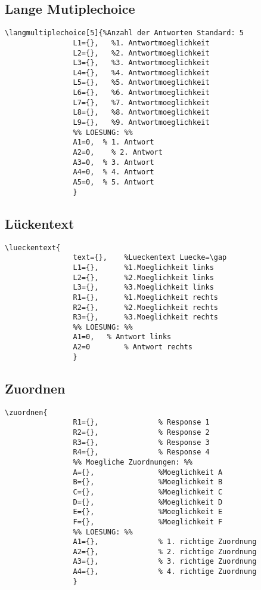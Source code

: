\documentclass[a4paper,12pt]{report}
\begin{document}
\begin{scriptsize}
\begin{minipage}{0.5\textwidth}
\subsection{Lange Mutiplechoice}
\begin{verbatim}
\langmultiplechoice[5]{%Anzahl der Antworten Standard: 5
				L1={},   %1. Antwortmoeglichkeit 
				L2={},   %2. Antwortmoeglichkeit
				L3={},   %3. Antwortmoeglichkeit
				L4={},   %4. Antwortmoeglichkeit
				L5={},	 %5. Antwortmoeglichkeit
				L6={},	 %6. Antwortmoeglichkeit
				L7={},	 %7. Antwortmoeglichkeit
				L8={},	 %8. Antwortmoeglichkeit
				L9={},	 %9. Antwortmoeglichkeit
				%% LOESUNG: %%
				A1=0,  % 1. Antwort
				A2=0,	 % 2. Antwort
				A3=0,  % 3. Antwort
				A4=0,  % 4. Antwort
				A5=0,  % 5. Antwort
				}
\end{verbatim}
\end{minipage}\leer


\begin{minipage}[t]{0.5\textwidth}
\subsection{Lückentext}
\begin{verbatim}
\lueckentext{
				text={}, 	%Lueckentext Luecke=\gap
				L1={}, 		%1.Moeglichkeit links  
				L2={}, 		%2.Moeglichkeit links
				L3={}, 		%3.Moeglichkeit links
				R1={}, 		%1.Moeglichkeit rechts 
				R2={}, 		%2.Moeglichkeit rechts
				R3={}, 		%3.Moeglichkeit rechts
				%% LOESUNG: %%
				A1=0,   % Antwort links
				A2=0		% Antwort rechts 
				}
\end{verbatim}
\end{minipage}\begin{minipage}[t]{0.5\textwidth}
\subsection{Zuordnen}
\begin{verbatim}
\zuordnen{
				R1={},				% Response 1
				R2={},				% Response 2
				R3={},				% Response 3
				R4={},				% Response 4
				%% Moegliche Zuordnungen: %%
				A={}, 				%Moeglichkeit A  
				B={}, 				%Moeglichkeit B  
				C={}, 				%Moeglichkeit C  
				D={}, 				%Moeglichkeit D  
				E={}, 				%Moeglichkeit E  
				F={}, 				%Moeglichkeit F  
				%% LOESUNG: %%
				A1={},				% 1. richtige Zuordnung
				A2={},				% 2. richtige Zuordnung
				A3={},				% 3. richtige Zuordnung
				A4={},				% 4. richtige Zuordnung
				}
\end{verbatim}
\end{minipage}\leer


\end{scriptsize}
\end{document}
